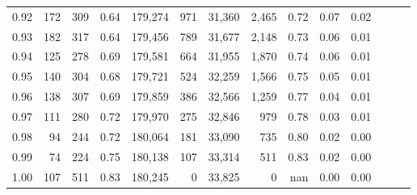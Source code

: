 \begin{tabular}{rrrrrrrrrrrrrr}
0.92 &    172 &  309 &  0.64 &  179,274 &      971 &  31,360 &   2,465 &  0.72 &  0.07 &      0.02 \\
0.93 &    182 &  317 &  0.64 &  179,456 &      789 &  31,677 &   2,148 &  0.73 &  0.06 &      0.01 \\
0.94 &    125 &  278 &  0.69 &  179,581 &      664 &  31,955 &   1,870 &  0.74 &  0.06 &      0.01 \\
0.95 &    140 &  304 &  0.68 &  179,721 &      524 &  32,259 &   1,566 &  0.75 &  0.05 &      0.01 \\
0.96 &    138 &  307 &  0.69 &  179,859 &      386 &  32,566 &   1,259 &  0.77 &  0.04 &      0.01 \\
0.97 &    111 &  280 &  0.72 &  179,970 &      275 &  32,846 &     979 &  0.78 &  0.03 &      0.01 \\
0.98 &     94 &  244 &  0.72 &  180,064 &      181 &  33,090 &     735 &  0.80 &  0.02 &      0.00 \\
0.99 &     74 &  224 &  0.75 &  180,138 &      107 &  33,314 &     511 &  0.83 &  0.02 &      0.00 \\
1.00 &    107 &  511 &  0.83 &  180,245 &        0 &  33,825 &       0 &   nan &  0.00 &      0.00 \\
\bottomrule
\end{tabular}
